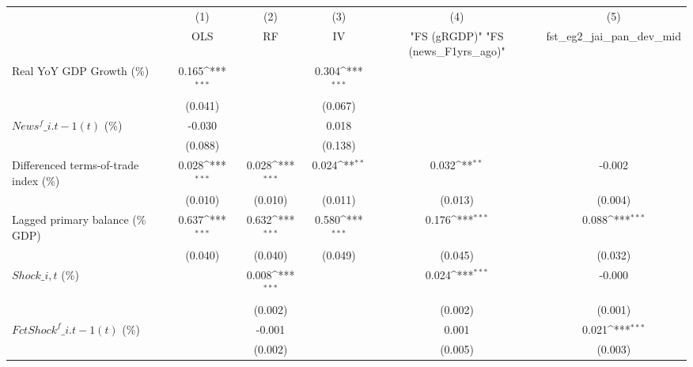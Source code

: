 {
\def\sym#1{\ifmmode^{#1}\else\(^{#1}\)\fi}
\begin{tabular}{l*{5}{c}}
\toprule
                    &\multicolumn{1}{c}{(1)}&\multicolumn{1}{c}{(2)}&\multicolumn{1}{c}{(3)}&\multicolumn{1}{c}{(4)}&\multicolumn{1}{c}{(5)}\\
                    &\multicolumn{1}{c}{OLS}&\multicolumn{1}{c}{RF}&\multicolumn{1}{c}{IV}&\multicolumn{1}{c}{ "FS (gRGDP)"  "FS (news\_F1yrs\_ago)" }&\multicolumn{1}{c}{fst\_eg2\_jai\_pan\_dev\_mid}\\
\midrule
Real YoY GDP Growth (\%)&       0.165\sym{***}&                     &       0.304\sym{***}&                     &                     \\
                    &     (0.041)         &                     &     (0.067)         &                     &                     \\
\addlinespace
$ News^f\_{i.t-1}(t)$ (\%)&      -0.030         &                     &       0.018         &                     &                     \\
                    &     (0.088)         &                     &     (0.138)         &                     &                     \\
\addlinespace
Differenced terms-of-trade index (\%)&       0.028\sym{***}&       0.028\sym{***}&       0.024\sym{**} &       0.032\sym{**} &      -0.002         \\
                    &     (0.010)         &     (0.010)         &     (0.011)         &     (0.013)         &     (0.004)         \\
\addlinespace
Lagged primary balance (\% GDP)&       0.637\sym{***}&       0.632\sym{***}&       0.580\sym{***}&       0.176\sym{***}&       0.088\sym{***}\\
                    &     (0.040)         &     (0.040)         &     (0.049)         &     (0.045)         &     (0.032)         \\
\addlinespace
$ Shock\_{i,t}$ (\%) &                     &       0.008\sym{***}&                     &       0.024\sym{***}&      -0.000         \\
                    &                     &     (0.002)         &                     &     (0.002)         &     (0.001)         \\
\addlinespace
$ FctShock^f\_{i.t-1}(t)$ (\%)&                     &      -0.001         &                     &       0.001         &       0.021\sym{***}\\
                    &                     &     (0.002)         &                     &     (0.005)         &     (0.003)         \\

\end{tabular}}

